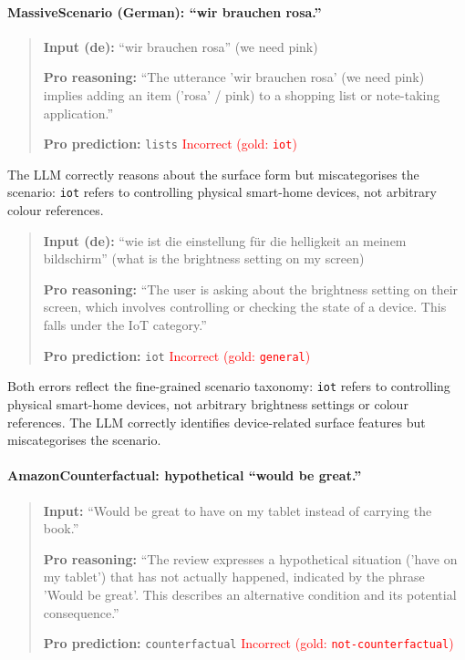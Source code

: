 \paragraph{MassiveScenario (German): ``wir brauchen rosa.''}
\begin{quote}
\small
\textbf{Input (de):} ``wir brauchen rosa'' (we need pink)

\textbf{Pro reasoning:} ``The utterance 'wir brauchen rosa' (we need pink) implies adding an item ('rosa' / pink) to a shopping list or note-taking application.''

\textbf{Pro prediction:} \texttt{lists} \hfill \textcolor{red}{Incorrect (gold: \texttt{iot})}
\end{quote}

\noindent The LLM correctly reasons about the surface form but miscategorises the scenario: \texttt{iot} refers to controlling physical smart-home devices, not arbitrary colour references.

\begin{quote}
\small
\textbf{Input (de):} ``wie ist die einstellung f{\"u}r die helligkeit an meinem bildschirm'' (what is the brightness setting on my screen)

\textbf{Pro reasoning:} ``The user is asking about the brightness setting on their screen, which involves controlling or checking the state of a device. This falls under the IoT category.''

\textbf{Pro prediction:} \texttt{iot} \hfill \textcolor{red}{Incorrect (gold: \texttt{general})}
\end{quote}

\noindent Both errors reflect the fine-grained scenario taxonomy: \texttt{iot} refers to controlling physical smart-home devices, not arbitrary brightness settings or colour references.
The LLM correctly identifies device-related surface features but miscategorises the scenario.

\paragraph{AmazonCounterfactual: hypothetical ``would be great.''}
\begin{quote}
\small
\textbf{Input:} ``Would be great to have on my tablet instead of carrying the book.''

\textbf{Pro reasoning:} ``The review expresses a hypothetical situation ('have on my tablet') that has not actually happened, indicated by the phrase 'Would be great'. This describes an alternative condition and its potential consequence.''

\textbf{Pro prediction:} \texttt{counterfactual} \hfill \textcolor{red}{Incorrect (gold: \texttt{not-counterfactual})}
\end{quote}

